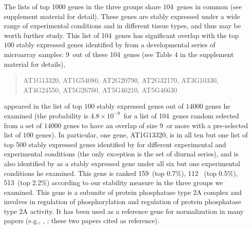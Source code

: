 \documentclass[letterpaper,12pt]{article}
\newcommand{\overlapGene}{104~}
\newcommand{\overlapGeneCze}{9~}
\newcommand{\overlapProb}{$4.8\times 10^{-9}$~}
\newcommand{\rankInSeedling}{159~}
\newcommand{\rankInLeaf}{112~}
\newcommand{\rankInTissue}{513~}
\newcommand{\rankTopPctSeedling}{0.7\%}
\newcommand{\rankTopPctLeaf}{0.5\%}
\newcommand{\rankTopPctTissue}{2.2\%}
\begin{document}

The lists of top 1000 genes in the three groups share \overlapGene genes in common (see supplement material for detail).  These
genes are stably expressed under a wide range of experimental conditions and
in different tissue types, and thus may be worth further study. This list of
\overlapGene genes has significant overlap with the top $100$ stably expressed genes
identified by \cite{czechowski2005genome} from a developmental series of
microarray samples: \overlapGeneCze out of these \overlapGene genes (see Table 4 in the
supplement material for details),
\begin{center}
\begin{quote}
AT1G13320, AT1G54080, AT2G20790, AT2G32170, AT3G10330,\\
 AT4G24550, AT5G26760, AT5G46210, AT5G46630 \\
\end{quote}
\end{center}
appeared in the list of top $100$ stably expressed genes
out of $14000$ genes he examined (the probability is \overlapProb for
a list of \overlapGene genes random selected from a set of $14000$ genes to have an
overlap of size \overlapGeneCze or more with a pre-selected list of $100$ genes). In
particular, one gene, AT1G13320, is in all ten but one list of top 500 stably
expressed genes identified by \cite{czechowski2005genome} for different
experimental and experimental conditions (the only exception is the set of
diurnal series), and is also identified by
\cite{hong2010identification} as a stably expressed gene under all six but one
experimental conditions he examined.  This gene is ranked \rankInSeedling (top \rankTopPctSeedling), \rankInLeaf
(top \rankTopPctLeaf), \rankInTissue (top \rankTopPctTissue) according to our stability measure in the three
groups we examined.
This gene is a subunite of protein phosphatase type 2A complex and involves in
regulation of phosphorylation and regulation of protein phosphatase type 2A
activity. It has been used as a reference gene for normalization in many
papers (e.g., \cite{bournier2013arabidopsis}, \cite{baron2012transcriptional};
these two papers cited \cite{czechowski2005genome} as reference). 
\end{document}
